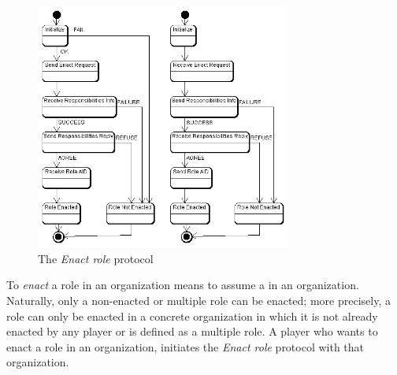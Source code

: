 \begin{figure}[ht]
	\centering
	\includegraphics[width=0.75\textwidth]{images/thespian/enact-role-protocol.png}
	\caption{The \textit{Enact role} protocol}
	\label{figure:thespian-enact-role-protocol}
\end{figure}

To \textit{enact} a role in an organization means to assume a in an organization.
Naturally, only a non-enacted or multiple role can be enacted; more precisely, a role can only be enacted in a concrete organization in which it is not already enacted by any player or is defined as a multiple role.
A player who wants to enact a role in an organization, initiates the \textit{Enact role} protocol with that organization.

